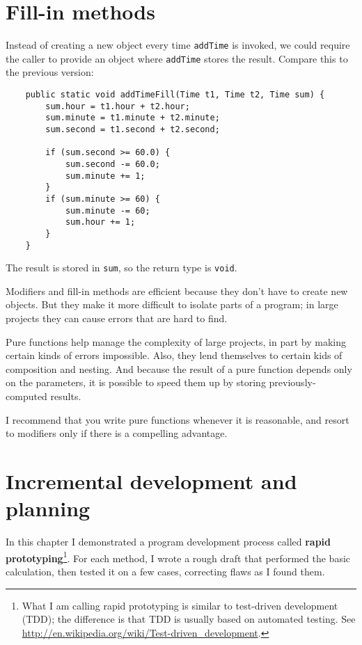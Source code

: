 \documentclass[12pt]{book}
\theoremstyle{definition}
\begin{document}
\section{Fill-in methods}

Instead of creating a new object every time {\tt addTime} is
invoked, we could require the caller to provide an
object where {\tt addTime} stores the result.  Compare
this to the previous version:

\begin{lstlisting}
    public static void addTimeFill(Time t1, Time t2, Time sum) {
        sum.hour = t1.hour + t2.hour;
        sum.minute = t1.minute + t2.minute;
        sum.second = t1.second + t2.second;

        if (sum.second >= 60.0) {
            sum.second -= 60.0;
            sum.minute += 1;
        }
        if (sum.minute >= 60) {
            sum.minute -= 60;
            sum.hour += 1;
        }
    }
\end{lstlisting}
%
The result is stored in {\tt sum}, so the return type is {\tt void}.

Modifiers and fill-in methods are efficient because they
don't have to create new objects.  But they make it more
difficult to isolate parts of a program; in large projects they can
cause errors that are hard to find.

Pure functions help manage the complexity of large projects,
in part by making certain kinds of errors impossible.  Also, they
lend themselves to certain kids of composition and nesting.
And because the result of a pure function depends only on the parameters,
it is possible to speed them up by storing previously-computed
results.

I recommend that you write pure functions whenever
it is reasonable, and resort to modifiers only if there
is a compelling advantage.


\section{Incremental development and planning}

In this chapter I demonstrated a program development process called
{\bf rapid prototyping}\footnote{What I am calling rapid prototyping
  is similar to test-driven development (TDD); the difference is that
  TDD is usually based on automated testing.  See
  \url{http://en.wikipedia.org/wiki/Test-driven_development}.}.  For
each method, I wrote a rough draft that performed the
basic calculation, then tested it on a few cases, correcting flaws
as I found them.
\end{document}
